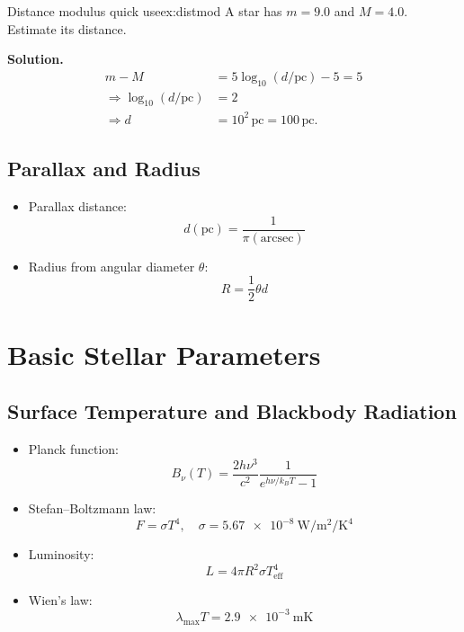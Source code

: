 \begin{example}{Distance modulus quick use}{ex:distmod}
A star has $m=9.0$ and $M=4.0$. Estimate its distance.

\smallskip\textbf{Solution.}
\begin{align*}
m-M &= 5\log_{10}(d/\text{pc})-5 = 5 \\
\Rightarrow \log_{10}(d/\text{pc}) &= 2 \\
\Rightarrow d &= 10^2\,\text{pc} = 100\,\text{pc}.
\end{align*}
\end{example}

\subsection{Parallax and Radius}
\begin{theory}
\begin{itemize}
    \item Parallax distance:
    \begin{equation}
        d(\text{pc}) = \frac{1}{\pi(\text{arcsec})}
    \end{equation}
    \item Radius from angular diameter $\theta$:
    \begin{equation}
        R = \frac{1}{2}\theta d
    \end{equation}
\end{itemize}
\end{theory}

\section{Basic Stellar Parameters}

\subsection{Surface Temperature and Blackbody Radiation}
\begin{theory}
\begin{itemize}
    \item Planck function:
    \begin{equation}
        B_\nu(T) = \frac{2h\nu^3}{c^2}\frac{1}{e^{h\nu/k_B T}-1}
    \end{equation}
    \item Stefan--Boltzmann law:
    \begin{equation}
        F = \sigma T^4, \quad \sigma = \SI{5.67e-8}{\watt\per\square\meter\per\kelvin\tothe{4}}
    \end{equation}
    \item Luminosity:
    \begin{equation}
        L = 4\pi R^2 \sigma T_{\text{eff}}^4
    \end{equation}
    \item Wien's law:
    \begin{equation}
        \lambda_{\text{max}}T = \SI{2.9e-3}{\meter\kelvin}
    \end{equation}
\end{itemize}
\end{theory}

